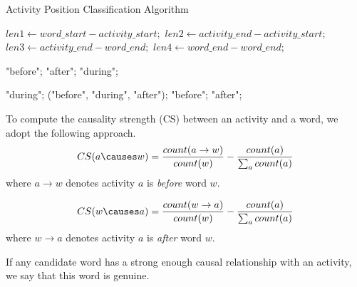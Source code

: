 \begin{algorithm}
	\scriptsize
	\caption{Activity Position Classification Algorithm}\label{alg:pca}
	\begin{algorithmic}
		\State $len1 \gets word\_start - activity\_start;$
		\State $len2 \gets activity\_end - activity\_start;$
		\State $len3 \gets activity\_end - word\_end;$
		\State $len4 \gets word\_end - word\_end;$
		
		\Return "before";
		\Return "after";
		\EndIf
		\State \Return "during";
		\EndIf
		
		\Return "during";
		\EndIf
		\State \Return ("before", "during", "after");
		\EndIf
		\Return "before";
		\EndIf
		\Return "after";
		\EndIf
		
	\end{algorithmic}
\end{algorithm}

To compute the causality strength (CS) between an activity and a word, we adopt the following
approach. 
\begin{equation*}
CS(a \causes w) = \frac{count(a \rightarrow w)}{count(w)} - \frac{count(a)}{\sum_a count(a)}
\end{equation*}
\noindent
where $a \rightarrow w$ denotes activity $a$ is \textit{before} word $w$.

\begin{equation*}
CS(w \causes a) = \frac{count(w \rightarrow a)}{count(w)} - \frac{count(a)}{\sum_a count(a)}
\end{equation*}
\noindent
where $w \rightarrow a$ denotes activity $a$ is \textit{after} word $w$.

If any candidate word has a strong enough causal relationship with an activity, 
we say that this word is genuine.
